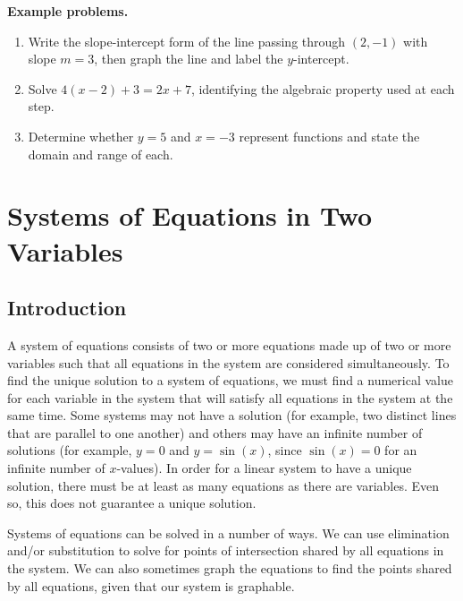 \textbf{Example problems.}

\begin{enumerate}
    \item Write the slope-intercept form of the line passing through $(2, -1)$ with slope $m = 3$, then graph the line and label the $y$-intercept.
    \item Solve $4(x - 2) + 3 = 2x + 7$, identifying the algebraic property used at each step.
    \item Determine whether $y = 5$ and $x = -3$ represent functions and state the domain and range of each.
\end{enumerate}

\section{Systems of Equations in Two Variables}
\label{sec:syst-660c}

\subsection{Introduction}
\label{sss:intr-8800}

A system of equations consists of two or more equations made up of two or more variables such that all equations in the system are considered simultaneously. To find the unique solution to a system of equations, we must find a numerical value for each variable in the system that will satisfy all equations in the system at the same time. Some systems may not have a solution (for example, two distinct lines that are parallel to one another) and others may have an infinite number of solutions (for example, $y = 0$ and $y = \sin(x)$, since $\sin(x) = 0$ for an infinite number of $x$-values). In order for a linear system to have a unique solution, there must be at least as many equations as there are variables. Even so, this does not guarantee a unique solution.

Systems of equations can be solved in a number of ways. We can use elimination and/or
substitution to solve for points of intersection shared by all equations in the system. We
can also sometimes graph the equations to find the points shared by all equations, given
that our system is graphable.


